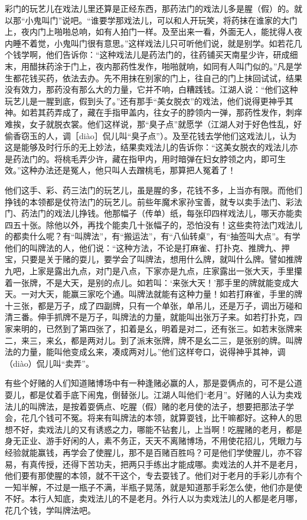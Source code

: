 \documentclass[12pt,UTF8]{ctexbook}
\begin{document}
彩门的玩艺儿在戏法儿里还算是正经东西，那药法门的戏法儿多是腥（假）的。就以那“小鬼叫门”说吧。“谁要学那戏法儿，可以和人开玩笑，将药抹在谁家的大门上，夜内门上啪啪总响，如有人拍门一样。及至出来一看，外面无人，能扰得人夜内睡不着觉，小鬼叫门很有意思。”这样戏法儿只可听他们说，就是别学。如若花几个钱学啊，他们告诉你：“这种戏法儿是药法门的，往药铺买天南星少许，研成细末，用醋抹药涂于门上，夜内那药性发作，啪啪就响，如同有人叫门似的。”凡是学生都花钱买药，依法去办。先不用抹在别家的门上，往自己的门上抹回试试，结果没有效力，那药没有那么大的力量，它并不响，白糟践钱。江湖人说：“他们这种玩艺儿是一腥到底，假到头了。”还有那手“美女脱衣”的戏法，他们说得更神乎其神。如若其药弄成了，藏在手指甲盖内，往女子的脖领内一弹，那药性发作，刺痒难挨，女子就脱衣裳。他们这样说，那“臭子点”就愿学（江湖人对于好色性乱，好偷香窃玉的人，调［diào］侃儿叫“臭子点”）。及至花钱去学他们这戏法儿，认为这是能够及时行乐的无上妙法，结果卖戏法儿的告诉你：“这美女脱衣的戏法儿亦是药法门的。将桃毛弄少许，藏在指甲内，用时暗弹在妇女脖领之内，即可生效。”这种办法还是冤人，他只叫人去蹭桃毛，那算把人冤着了！

他们这手、彩、药三法门的玩艺儿，虽是腥的多，花钱不多，上当亦有限。而他们挣钱的本领都是仗符法门的玩艺儿。前些年魔术家孙宝善，就专以卖手法门、彩法门、药法门的戏法儿挣钱。他那幅子（传单）纸，每张印四样戏法儿，哪天亦能卖四五十张。除他以外，再找个能卖几十张幅子的，恐怕没有！这些卖符法门戏法儿的都卖什么呢？有“叫牌法”，有“搬运法”，有“八仙转桌”，有“抽签叫大点”。有学他们的叫牌法的人，他们说：“这种方法，不论是打麻雀、打扑克、推牌九、押宝，只要是关于赌的耍儿，要学会了叫牌法，想用什么牌，就叫什么牌。譬如推牌九吧，上家是露出九点，对门是八点，下家亦是九点，庄家露出一张大天，手里攥着一张牌，不是大天，是别的点儿。如若叫：‘来张大天！’那手里的牌就能变成大天。一对大天，能赢三家吃个通。叫牌法就能有这种力量！如若打麻雀，手里的牌十三张，都是万子，成了四副牌，只有一个单张，单吊儿，还是万子，调出万碰和清三番。伸手抓牌不是万子，叫牌法的力量，就能叫出张万子来。如若打扑克，四家来明的，已然到了第四张了，扣着是幺，明着是对二，还有张三。如若末张牌来二，来三，来幺，都是两对儿。到了派末张牌，牌不是幺二三，是张别的牌。叫牌法的力量，能叫他变成幺来，凑成两对儿。”他们这样夸口，说得神乎其神，调（diào）侃儿叫“卖弄”。

有些个好赌的人们知道赌博场中有一种逢赌必赢的人，那是耍俩点的，可不是公道耍儿，都是仗着手底下闹鬼，倒替张儿。江湖人叫他们“老月”。好赌的人认为卖戏法儿的叫牌法，是按着耍俩点、吃腥（假）赌的老月使的法子，想要把那法子学会，花几个钱可不冤。将来有叫牌法的本领，就算耍钱，比干嘛都好。这种人的思想不好，卖戏法儿的又有诱惑之力，哪能不钻套儿，上当啊！吃腥赌的老月，都是身无正业、游手好闲的人，素不务正，天天不离赌博场，不用使花招儿，凭眼力与经验就能赢钱，再学会了使腥儿，那不是百赌百胜吗？可是他们学使腥儿，亦不容易，有真传授，还得下苦功夫，把两只手练出才能成哪。卖戏法的人并不是老月，他们要有那使腥的本领，就不干这个，专去耍钱了。他们对于老月的手彩儿亦有个一知半解，不过是一瓶子不满，半瓶子晃荡，就是知道那手彩怎么使，他们亦是使不好。本行人知底，卖戏法儿的不是老月。外行人以为卖戏法儿的人都是老月哪，花几个钱，学叫牌法吧。
\end{document}

